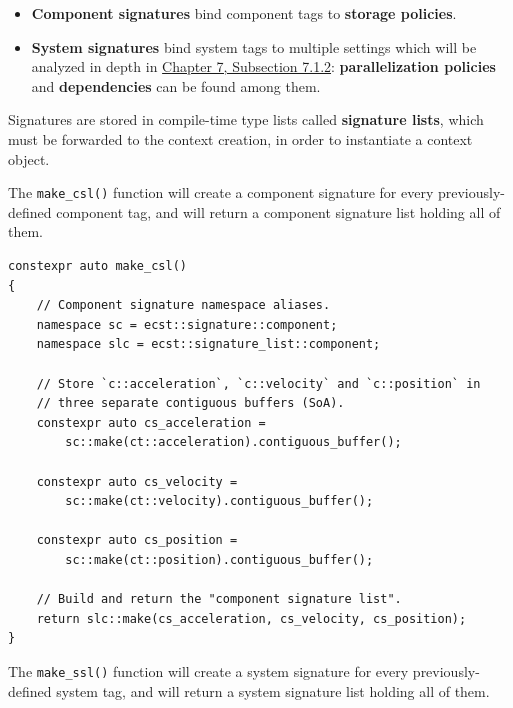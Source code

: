\documentclass[twoside, 12pt, a4paper, openright]{book}
\begin{document}
\begin{itemize}
\item
  \textbf{Component signatures} bind component tags to \textbf{storage
  policies}.
\item
  \textbf{System signatures} bind system tags to multiple settings which
  will be analyzed in depth in \protect\hyperlink{system_sigs}{Chapter
  7, Subsection 7.1.2}: \textbf{parallelization policies} and
  \textbf{dependencies} can be found among them.
\end{itemize}

Signatures are stored in compile-time type lists called
\textbf{signature lists}, which must be forwarded to the context
creation, in order to instantiate a context object.

The
\texttt{make_csl()}
function will create a component signature for every previously-defined
component tag, and will return a component signature list holding all of
them.

\begin{verbatim}
constexpr auto make_csl()
{
    // Component signature namespace aliases.
    namespace sc = ecst::signature::component;
    namespace slc = ecst::signature_list::component;

    // Store `c::acceleration`, `c::velocity` and `c::position` in
    // three separate contiguous buffers (SoA).
    constexpr auto cs_acceleration =
        sc::make(ct::acceleration).contiguous_buffer();

    constexpr auto cs_velocity =
        sc::make(ct::velocity).contiguous_buffer();

    constexpr auto cs_position =
        sc::make(ct::position).contiguous_buffer();

    // Build and return the "component signature list".
    return slc::make(cs_acceleration, cs_velocity, cs_position);
}
\end{verbatim}

The
\texttt{make_ssl()}
function will create a system signature for every previously-defined
system tag, and will return a system signature list holding all of them.
\end{document}
